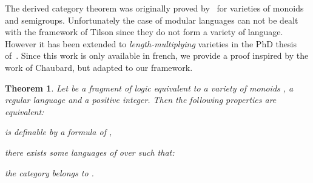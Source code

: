 \documentclass[submission,hidelink]{dmtcs-episciences}
\newtheorem{theorem}{Theorem}
\newenvironment{conditions}
{\begin{list}{\rm (\theenumi)}{\noindent \usecounter{enumi}\setlength{\topsep}{2pt}\setlength{\partopsep}{0pt}\setlength{\itemsep}{2pt}\setlength{\parsep}{0pt}\setlength{\leftmargin}{2.5em}\setlength{\labelwidth}{1.5em}\setlength{\labelsep}{0.5em}\setlength{\listparindent}{0pt}\setlength{\itemindent}{0pt}}}{\end{list}}
\begin{document}
		The derived category theorem was originally proved by~\cite{Tilson} for varieties of monoids and semigroups. Unfortunately the case of
		 modular languages can not be dealt with the framework of Tilson since they do not
		 form a variety of language. However it has been extended to \emph{length-multiplying} varieties in the PhD thesis of~\cite{ChaubPhD}. Since this work is only available in french, we provide a proof inspired by the work of Chaubard, but adapted to our framework.


		 \begin{theorem}	\label{thm:derivedcategory}
			Let  be a fragment of logic equivalent to a variety of monoids ,
			 a regular language and  a positive integer.
			Then the following properties are equivalent:
			\begin{conditions}
				\item\label{derivedcategory:1}  is definable by a formula of ,

				\item\label{derivedcategory:3} there exists
				      some languages  of
				       over  such that:
				\item\label{derivedcategory:2} the category  belongs to .
			\end{conditions}
\end{theorem}
\end{document}
